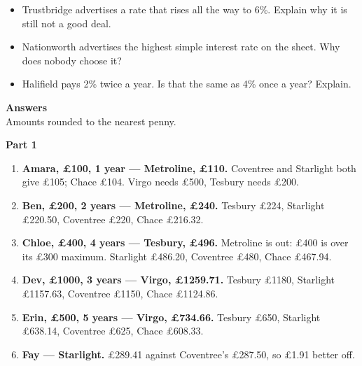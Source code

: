 \documentclass[12pt]{article}
\begin{document}
\vfill
\begin{tcolorbox}[enhanced,colback=black!4,colframe=black!45,boxrule=0.8pt,arc=2mm,
                  left=4mm,right=4mm,top=3mm,bottom=3mm,
                  title={Think about},fonttitle=\bfseries,colbacktitle=black!45]
\begin{itemize}[leftmargin=5mm,itemsep=2mm,topsep=1mm,label=\textbullet]
  \item Trustbridge advertises a rate that rises all the way to 6\%. Explain why it is still not a good deal.
  \item Nationworth advertises the highest simple interest rate on the sheet. Why does nobody choose it?
  \item Halifield pays 2\% twice a year. Is that the same as 4\% once a year? Explain.
\end{itemize}
\end{tcolorbox}

\newpage
\begin{center}
  {\LARGE\bfseries Answers}\\[1.5mm]
  {\small Amounts rounded to the nearest penny.}
\end{center}
\vspace{3mm}

{\bfseries\large Part 1}
\begin{enumerate}[leftmargin=8mm,itemsep=2mm,topsep=2mm]
  \item \textbf{Amara, \pounds100, 1 year --- Metroline, \pounds110.}
        Coventree and Starlight both give \pounds105; Chace \pounds104. Virgo needs \pounds500, Tesbury needs \pounds200.
  \item \textbf{Ben, \pounds200, 2 years --- Metroline, \pounds240.}
        Tesbury \pounds224, Starlight \pounds220.50, Coventree \pounds220, Chace \pounds216.32.
  \item \textbf{Chloe, \pounds400, 4 years --- Tesbury, \pounds496.}
        Metroline is out: \pounds400 is over its \pounds300 maximum. Starlight \pounds486.20, Coventree \pounds480, Chace \pounds467.94.
  \item \textbf{Dev, \pounds1000, 3 years --- Virgo, \pounds1259.71.}
        Tesbury \pounds1180, Starlight \pounds1157.63, Coventree \pounds1150, Chace \pounds1124.86.
  \item \textbf{Erin, \pounds500, 5 years --- Virgo, \pounds734.66.}
        Tesbury \pounds650, Starlight \pounds638.14, Coventree \pounds625, Chace \pounds608.33.
  \item \textbf{Fay --- Starlight.} \pounds289.41 against Coventree's \pounds287.50, so \pounds1.91 better off.
\end{enumerate}
\end{document}
